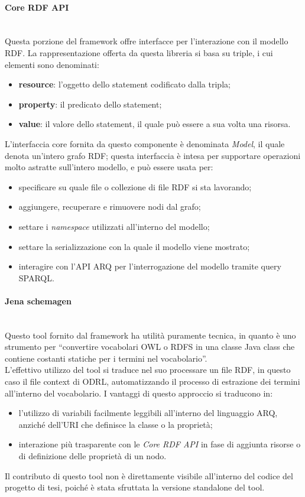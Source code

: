\documentclass[12pt,a4paper,twoside]{book}
\begin{document}
\paragraph{Core RDF API}\mbox{}\\
Questa porzione del framework offre interfacce per l'interazione con il modello RDF. La rappresentazione offerta da questa libreria si basa su triple, i cui elementi sono denominati:
\begin{itemize}
\item \textbf{resource}: l'oggetto dello statement codificato dalla tripla;
\item \textbf{property}: il predicato dello statement;
\item \textbf{value}: il valore dello statement, il quale può essere a sua volta una risorsa.
\end{itemize}
L'interfaccia core fornita da questo componente è denominata \textit{Model}, il quale denota un'intero grafo RDF; questa interfaccia è intesa per supportare operazioni molto astratte sull'intero modello, e può essere usata per:
\begin{itemize}
\item specificare su quale file o collezione di file RDF si sta lavorando;
\item aggiungere, recuperare e rimuovere nodi dal grafo;
\item settare i \textit{namespace} utilizzati all'interno del modello;
\item settare la serializzazione con la quale il modello viene mostrato;
\item interagire con l'API ARQ per l'interrogazione del modello tramite query SPARQL.
\end{itemize}
\paragraph{Jena schemagen}\mbox{}\\
Questo tool fornito dal framework ha utilità puramente tecnica, in quanto è uno strumento per ``convertire vocabolari OWL o RDFS in una classe Java class che contiene costanti statiche per i termini nel vocabolario''.\\
L'effettivo utilizzo del tool si traduce nel suo processare un file RDF, in questo caso il file context di ODRL\cite{ODRLContext}, automatizzando il processo di estrazione dei termini all'interno del vocabolario. I vantaggi di questo approccio si traducono in:
\begin{itemize}
\item l'utilizzo di variabili facilmente leggibili all'interno del linguaggio ARQ, anziché dell'URI che definisce la classe o la proprietà;
\item interazione più trasparente con le \textit{Core RDF API} in fase di aggiunta risorse o di definizione delle proprietà di un nodo.
\end{itemize}
Il contributo di questo tool non è direttamente visibile all'interno del codice del progetto di tesi, poiché è stata sfruttata la versione standalone del tool.
\end{document}

